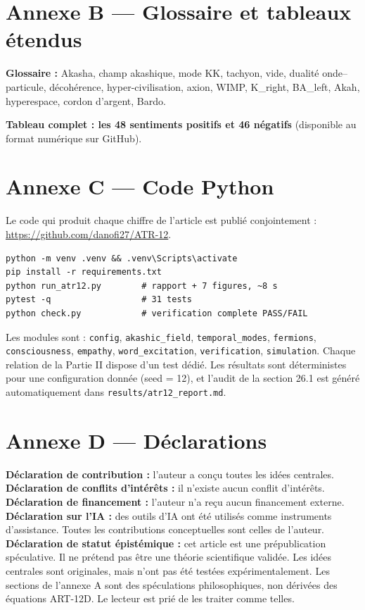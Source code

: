 \documentclass[11pt,a4paper]{article}
\begin{document}
\section{Annexe B --- Glossaire et tableaux étendus}
\textbf{Glossaire :} Akasha, champ akashique, mode KK, tachyon, vide, dualité onde--particule, décohérence, hyper-civilisation, axion, WIMP, K\_right, BA\_left, Akah, hyperespace, cordon d'argent, Bardo.

\textbf{Tableau complet : les 48 sentiments positifs et 46 négatifs} (disponible au format numérique sur GitHub).

\section{Annexe C --- Code Python}
Le code qui produit chaque chiffre de l'article est publié conjointement : \url{https://github.com/danofi27/ATR-12}.

\begin{verbatim}
python -m venv .venv && .venv\Scripts\activate
pip install -r requirements.txt
python run_atr12.py        # rapport + 7 figures, ~8 s
pytest -q                  # 31 tests
python check.py            # verification complete PASS/FAIL
\end{verbatim}

Les modules sont : \texttt{config}, \texttt{akashic\_field}, \texttt{temporal\_modes}, \texttt{fermions}, \texttt{consciousness}, \texttt{empathy}, \texttt{word\_excitation}, \texttt{verification}, \texttt{simulation}. Chaque relation de la Partie II dispose d'un test dédié. Les résultats sont déterministes pour une configuration donnée (seed = 12), et l'audit de la section 26.1 est généré automatiquement dans \texttt{results/atr12\_report.md}.

\section{Annexe D --- Déclarations}
\textbf{Déclaration de contribution :} l'auteur a conçu toutes les idées centrales. \\
\textbf{Déclaration de conflits d'intérêts :} il n'existe aucun conflit d'intérêts. \\
\textbf{Déclaration de financement :} l'auteur n'a reçu aucun financement externe. \\
\textbf{Déclaration sur l'IA :} des outils d'IA ont été utilisés comme instruments d'assistance. Toutes les contributions conceptuelles sont celles de l'auteur. \\
\textbf{Déclaration de statut épistémique :} cet article est une prépublication spéculative. Il ne prétend pas être une théorie scientifique validée. Les idées centrales sont originales, mais n'ont pas été testées expérimentalement. Les sections de l'annexe A sont des spéculations philosophiques, non dérivées des équations ART-12D. Le lecteur est prié de les traiter comme telles.
\end{document}
